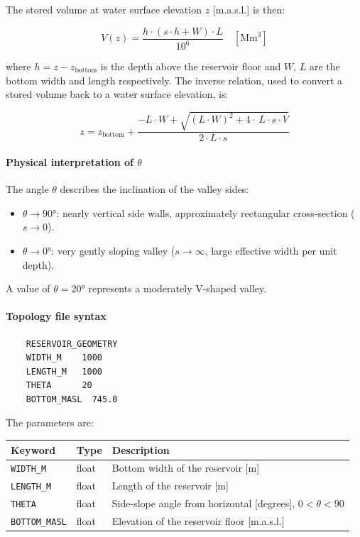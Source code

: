 \documentclass[a4paper, 12pt]{report}
\begin{document}
	The stored volume at water surface elevation $z$ [m.a.s.l.] is then:

	\begin{equation}
		V(z) = \frac{h \cdot (s \cdot h + W) \cdot L}{10^6} \quad [\text{Mm}^3]
	\end{equation}

	\noindent where $h = z - z_\text{bottom}$ is the depth above the reservoir floor and $W$, $L$ are the bottom width and length respectively. The inverse relation, used to convert a stored volume back to a water surface elevation, is:


	\begin{equation}
		z = z_\text{bottom} + \frac{-L \cdot W + \sqrt{(L \cdot W)^2 + 4 \cdot \ L \cdot s \cdot V}}{2 \cdot L \cdot s}
	\end{equation}


	
	\paragraph{Physical interpretation of $\theta$}


	The angle $\theta$ describes the inclination of the valley sides:
	\begin{itemize}
		\item $\theta \to 90°$: nearly vertical side walls, approximately rectangular cross-section ($s \to 0$).
		\item $\theta \to 0°$: very gently sloping valley ($s \to \infty$, large effective width per unit depth).
	\end{itemize}
	A value of $\theta = 20°$ represents a moderately V-shaped valley.

	\paragraph{Topology file syntax}

\begin{verbatim}
	RESERVOIR_GEOMETRY
	WIDTH_M    1000
	LENGTH_M   1000
	THETA      20
	BOTTOM_MASL  745.0
\end{verbatim}

\noindent The parameters are:
\begin{center}
	\begin{tabular}{lll}
		\hline
		Keyword & Type & Description \\
		\hline
		\texttt{WIDTH\_M}     & float & Bottom width of the reservoir [m] \\
		\texttt{LENGTH\_M}    & float & Length of the reservoir [m] \\
		\texttt{THETA}        & float & Side-slope angle from horizontal [degrees], $0 < \theta < 90$ \\
		\texttt{BOTTOM\_MASL} & float & Elevation of the reservoir floor [m.a.s.l.] \\
		\hline
	\end{tabular}
\end{center}
\end{document}

